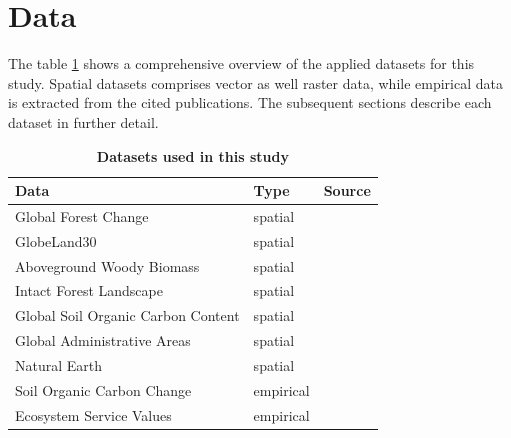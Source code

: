 \section{Data}
\label{sec:data}
	The table \ref{tab:datasets} shows a comprehensive overview of the applied datasets for this study. Spatial datasets comprises vector as well raster data, while empirical data is extracted from the cited publications. The subsequent sections describe each dataset in further detail.
	\begin{table}[ht]
		\centering
		\caption[Datasets used in this study]{\textbf{Datasets used in this study}}
		\label{tab:datasets}
		\begin{tabular}{lll}
			\hline
			Data & Type & Source \\\hline
			Global Forest Change & spatial & \citet{Hansen2013} \\
			GlobeLand30 & spatial & \citet{Chen2015} \\
			Aboveground Woody Biomass & spatial & \citet{Baccini2015} \\
			Intact Forest Landscape & spatial & \citet{Potapov2017} \\
			Global Soil Organic Carbon Content & spatial & \citet{FAO2018} \\
			Global Administrative Areas & spatial & \citet{Hijmans2018} \\
			Natural Earth & spatial &\\
			Soil Organic Carbon Change & empirical & \citet{Don2010} \\
			\multirow{3}{*}{Ecosystem Service Values} & \multirow{3}{*}{empirical} & \citet{Costanza2014} \\
			&& \citet{Groot2012} \\
			&& \citet{Siikamaki2015} \\\hline
		\end{tabular}
	\end{table}

